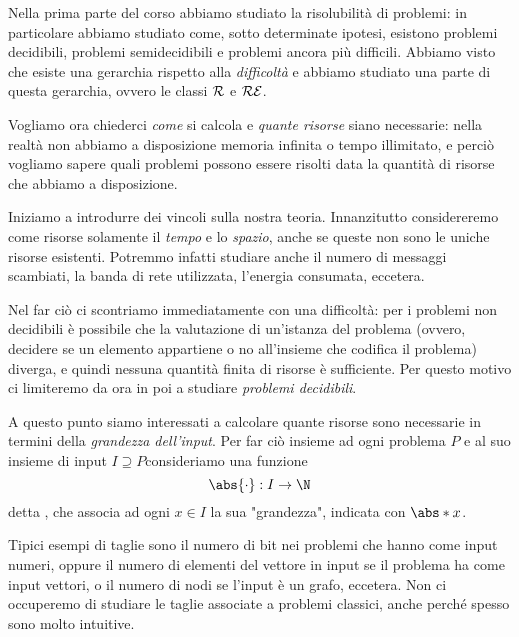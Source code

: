 Nella prima parte del corso abbiamo studiato la risolubilità di problemi:
in particolare abbiamo studiato come, sotto determinate ipotesi,
esistono problemi decidibili, problemi semidecidibili e problemi ancora più
difficili. 
Abbiamo visto che esiste una gerarchia rispetto alla \emph{difficoltà} 
e abbiamo studiato una parte di questa gerarchia, ovvero le classi $\mathcal{R}$ e $\mathcal{RE}$.

Vogliamo ora chiederci \emph{come} si calcola e \emph{quante risorse} siano necessarie:
nella realtà non abbiamo a disposizione memoria infinita o tempo illimitato, 
e perciò vogliamo sapere quali problemi possono essere risolti data la quantità di risorse che
abbiamo a disposizione.

Iniziamo a introdurre dei vincoli sulla nostra teoria. 
Innanzitutto considereremo come risorse solamente il \emph{tempo} e lo \emph{spazio},
anche se queste non sono le uniche risorse esistenti. Potremmo infatti studiare anche 
il numero di messaggi scambiati, la banda di rete utilizzata, l'energia consumata, eccetera.

Nel far ciò ci scontriamo immediatamente con una difficoltà: 
per i problemi non decidibili è possibile che la valutazione di un'istanza del problema
(ovvero, decidere se un elemento appartiene o no all'insieme che codifica il problema)
diverga, e quindi nessuna quantità finita di risorse è sufficiente. 
Per questo motivo ci limiteremo da ora in poi a studiare \emph{problemi decidibili}.

A questo punto siamo interessati a calcolare quante risorse sono necessarie in termini 
della \emph{grandezza dell'input}. Per far ciò insieme ad ogni problema $P$ e al suo
insieme di input $I \supseteq P$\footnotemark consideriamo 
una funzione \[
    \abs{\cdot} : I \to \N
\] detta , che associa ad ogni $x \in I$ la sua "grandezza", 
indicata con $\abs*{x}$. 


Tipici esempi di taglie sono il numero di bit nei problemi che hanno come input numeri,
oppure il numero di elementi del vettore in input se il problema ha come input vettori,
o il numero di nodi se l'input è un grafo, eccetera.
Non ci occuperemo di studiare le taglie associate a problemi classici, 
anche perché spesso sono molto intuitive.

